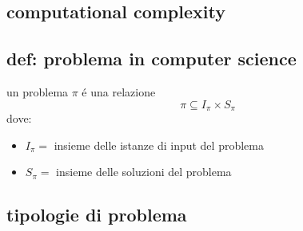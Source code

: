 \begin{flushleft}
	\section{computational complexity}

	\subsection{def: problema in computer science}
		un problema $\pi$ \'e una relazione
		$$\pi\subseteq I_{\pi}\times S_{\pi}$$
		dove:
		\begin{itemize}
			\item $I_{\pi}=$ insieme delle istanze di input del problema
			\item $S_{\pi}=$ insieme delle soluzioni del problema
		\end{itemize}

	\subsection{tipologie di problema}

	\pagebreak
\end{flushleft}
